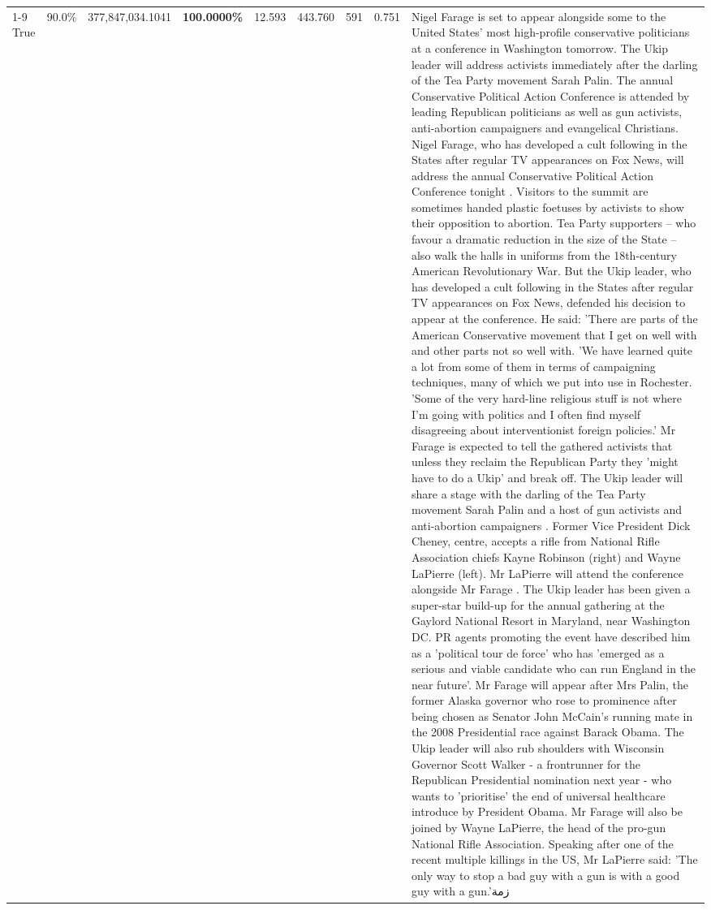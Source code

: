 \begin{table}[H]
\begin{tabular}{lllrlllll}
\cline{1-9}
True & 90.0\% & 377,847,034.1041 & \bfseries \color{red} 100.0000\% & 12.593 & 443.760 & 591 & 0.751 & Nigel Farage is set to appear alongside some to the United States' most high-profile conservative politicians at a conference in Washington tomorrow. The Ukip leader will address activists immediately after the darling of the Tea Party movement Sarah Palin. The annual Conservative Political Action Conference is attended by leading Republican politicians as well as gun activists, anti-abortion campaigners and evangelical Christians. Nigel Farage, who has developed a cult following in the States after regular TV appearances on Fox News, will address the annual Conservative Political Action Conference tonight . Visitors to the summit are sometimes handed plastic foetuses by activists to show their opposition to abortion. Tea Party supporters – who favour a dramatic reduction in the size of the State – also walk the halls in uniforms from the 18th-century American Revolutionary War. But the Ukip leader, who has developed a cult following in the States after regular TV appearances on Fox News, defended his decision to appear at the conference. He said: 'There are parts of the American Conservative movement that I get on well with and other parts not so well with. 'We have learned quite a lot from some of them in terms of campaigning techniques, many of which we put into use in Rochester. 'Some of the very hard-line religious stuff is not where I'm going with politics and I often find myself disagreeing about interventionist foreign policies.' Mr Farage is expected to tell the gathered activists that unless they reclaim the Republican Party they 'might have to do a Ukip' and break off. The Ukip leader will share a stage with the darling of the Tea Party movement Sarah Palin and a host of gun activists and anti-abortion campaigners . Former Vice President Dick Cheney, centre, accepts a rifle from National Rifle Association chiefs Kayne Robinson (right) and Wayne LaPierre (left). Mr LaPierre will attend the conference alongside Mr Farage . The Ukip leader has been given a super-star build-up for the annual gathering at the Gaylord National Resort in Maryland, near Washington DC. PR agents promoting the event have described him as a 'political tour de force' who has 'emerged as a serious and viable candidate who can run England in the near future'. Mr Farage will appear after Mrs Palin, the former Alaska governor who rose to prominence after being chosen as Senator John McCain's running mate in the 2008 Presidential race against Barack Obama. The Ukip leader will also rub shoulders with Wisconsin Governor Scott Walker - a frontrunner for the Republican Presidential nomination next year - who wants to 'prioritise' the end of universal healthcare introduce by President Obama. Mr Farage will also be joined by Wayne LaPierre, the head of the pro-gun National Rifle Association. Speaking after one of the recent multiple killings in the US, Mr LaPierre said: 'The only way to stop a bad guy with a gun is with a good guy with a gun.'زمة \\

\end{tabular}
\end{table}
